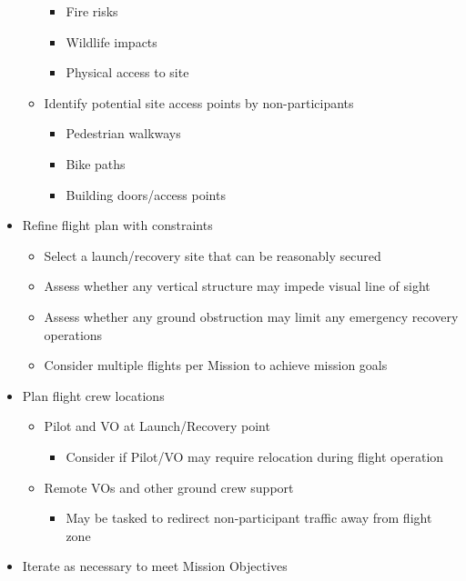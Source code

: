 \documentclass[
  12pt,
]{book}
\providecommand{\tightlist}{%
  \setlength{\itemsep}{0pt}\setlength{\parskip}{0pt}}
\begin{document}
\begin{itemize}
\begin{itemize}
    \begin{itemize}
    \tightlist
    \item
      Fire risks
    \item
      Wildlife impacts
    \item
      Physical access to site
    \end{itemize}
  \item
    Identify potential site access points by non-participants

    \begin{itemize}
    \tightlist
    \item
      Pedestrian walkways
    \item
      Bike paths
    \item
      Building doors/access points
    \end{itemize}
  \end{itemize}
\item
  Refine flight plan with constraints

  \begin{itemize}
  \tightlist
  \item
    Select a launch/recovery site that can be reasonably secured
  \item
    Assess whether any vertical structure may impede visual line of sight
  \item
    Assess whether any ground obstruction may limit any emergency recovery operations
  \item
    Consider multiple flights per Mission to achieve mission goals
  \end{itemize}
\item
  Plan flight crew locations

  \begin{itemize}
  \tightlist
  \item
    Pilot and VO at Launch/Recovery point

    \begin{itemize}
    \tightlist
    \item
      Consider if Pilot/VO may require relocation during flight operation
    \end{itemize}
  \item
    Remote VOs and other ground crew support

    \begin{itemize}
    \tightlist
    \item
      May be tasked to redirect non-participant traffic away from flight zone
    \end{itemize}
  \end{itemize}
\item
  Iterate as necessary to meet Mission Objectives
\end{itemize}
\end{document}
